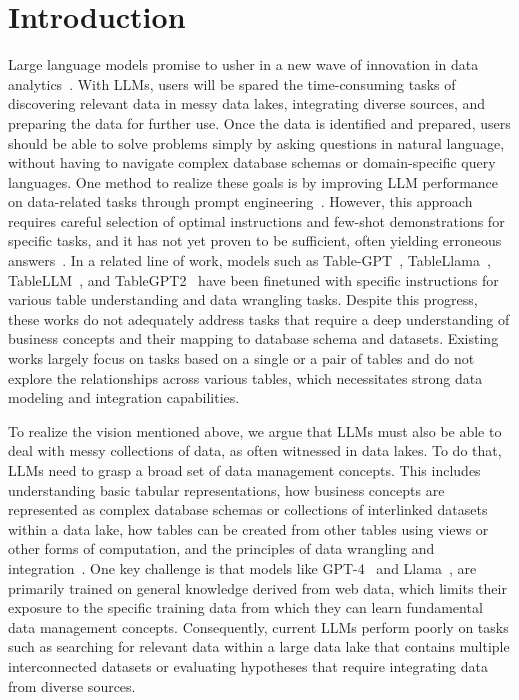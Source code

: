 \section{Introduction}
\label{sec:intro}

Large language models promise to usher in a new wave of innovation in data analytics~\citep{llm_data_wrangling2022,fernandez2023large,zhou2024llm,anderson2024design}. 
%
With LLMs, users will be spared the time-consuming tasks of discovering relevant data in messy data lakes, integrating diverse sources, and preparing the data for further use. Once the data is identified and prepared, users should be able to solve problems simply by asking questions in natural language, without having to navigate complex database schemas or domain-specific query languages. 
%
One method to realize these goals is by improving LLM performance on data-related tasks through prompt engineering~\citep{llm_data_wrangling2022,chorus}. 
%
However, this approach requires careful selection of optimal instructions and few-shot demonstrations for specific tasks, and it has not yet proven to be sufficient, often yielding erroneous answers~\citep{zhu2024chat2query}. In a related line of work,  models such as Table-GPT~\citep{table-gpt}, TableLlama~\citep{zhang2024tablellama}, TableLLM~\citep{wu2024tablebench}, and TableGPT2~\citep{su2024tablegpt2} have been finetuned with specific instructions for various table understanding and data wrangling tasks. Despite this progress, these works do not adequately address tasks that require a deep understanding of business concepts and their mapping to database schema and datasets. Existing works largely focus on tasks based on a single or a pair of tables and do not explore the relationships across various tables, which necessitates strong data modeling and integration capabilities.


To realize the vision mentioned above, we argue that LLMs must also be able to deal with messy collections of data, as often witnessed in data lakes. To do that, LLMs need to grasp a broad set of data management concepts. This includes understanding basic tabular representations, how business concepts are represented as complex database schemas or collections of interlinked datasets within a data lake, how tables can be created from other tables using views or other forms of computation, and the principles of data wrangling and integration~\citep{doan2012principles}. One key challenge is that models like GPT-4~\cite{achiam2023gpt} and Llama~\citep{touvron2023llama}, are primarily trained on general knowledge derived from web data, which limits their exposure to the specific training data from which they can learn fundamental data management concepts. Consequently, current LLMs perform poorly on tasks such as searching for relevant data within a large data lake that contains multiple interconnected datasets or evaluating hypotheses that require integrating data from diverse sources.

